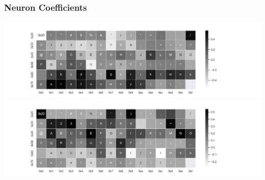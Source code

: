 \begin{frame}
\frametitle{Neuron Coefficients}
\includegraphics[width=\textwidth]{res/neuron-a-coefs.png}
\includegraphics[width=\textwidth]{res/neuron-b-coefs.png}
\end{frame}